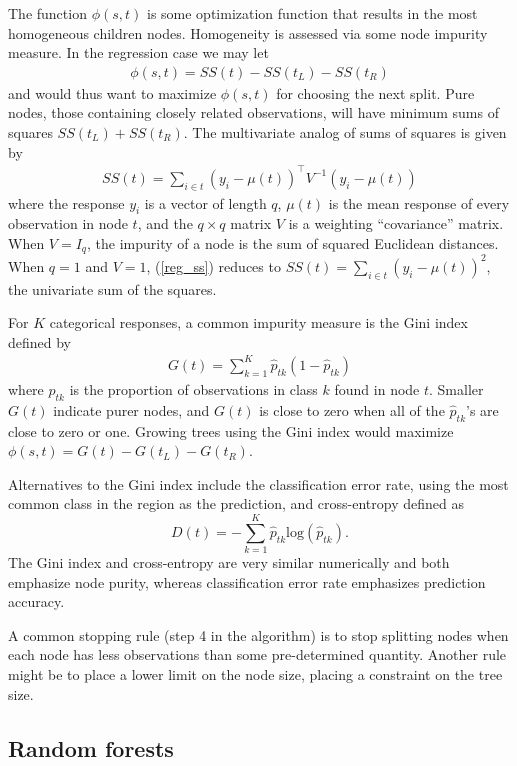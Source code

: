 The function $\phi(s, t)$ is some optimization function that results in the most homogeneous children nodes. Homogeneity is assessed via some node impurity measure. In the regression case we may let
\begin{eqnarray}
\phi(s, t) = SS(t) - SS(t_L) - SS(t_R)
\label{reg_phi}
\end{eqnarray}
and would thus want to maximize $\phi(s, t)$ for choosing the next split. Pure nodes, those containing closely related observations, will have minimum sums of squares $SS(t_L) + SS(t_R)$. The multivariate analog of sums of squares is given by
\begin{eqnarray}
SS(t) = \sum_{i\in t}(y_i-\mu(t))^\top V^{-1} (y_i-\mu(t))
\label{reg_ss}
\end{eqnarray}
where the response $y_i$ is a vector of length $q$, $\mu(t)$ is the mean response of every observation in node $t$, and the $q\times q$ matrix $V$ is a weighting ``covariance'' matrix. When $V=I_q$, the impurity of a node is the sum of squared Euclidean distances. When $q=1$ and $V=1$, (\ref{reg_ss}) reduces to $SS(t) = \sum_{i\in t}(y_i-\mu(t))^2$, the univariate sum of the squares.

For $K$ categorical responses, a common impurity measure is the Gini index defined by
\begin{eqnarray}
G(t) = \sum_{k=1}^K\hat{p}_{tk}(1-\hat{p}_{tk})
\label{cla_gini}
\end{eqnarray}
where $\hat{p}_{tk}$ is the proportion of observations in class $k$ found in node $t$. Smaller $G(t)$ indicate purer nodes, and $G(t)$ is close to zero when all of the $\hat{p}_{tk}$'s are close to zero or one. Growing trees using the Gini index would maximize $\phi(s, t)=G(t) - G(t_L) - G(t_R)$. 

Alternatives to the Gini index include the classification error rate, using the most common class in the region as the prediction, and cross-entropy defined as
\[D(t) = -\sum_{k=1}^K\hat{p}_{tk}\mathrm{log}(\hat{p}_{tk}).\]
The Gini index and cross-entropy are very similar numerically and both emphasize node purity, whereas classification error rate emphasizes prediction accuracy.

A common stopping rule (step 4 in the algorithm) is to stop splitting nodes when each node has less observations than some pre-determined quantity. Another rule might be to place a lower limit on the node size, placing a constraint on the tree size.

\subsection{Random forests}

